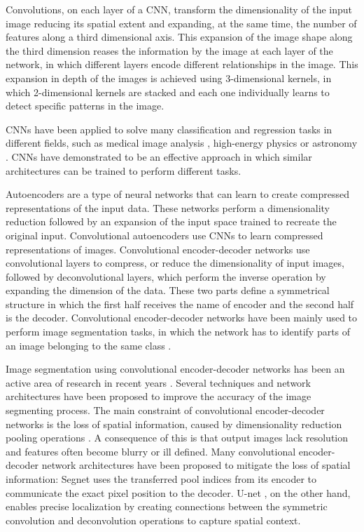 \documentclass[twocol]{ametsoc}
\begin{document}
Convolutions, on each layer of a CNN, transform the dimensionality of the input image reducing its spatial extent and expanding, at the same time, the number of features along a third dimensional axis. This expansion of the image shape along the third dimension reases the information by the image at each layer of the network, in which different layers encode different relationships in the image. This expansion in depth of the images is achieved using 3-dimensional kernels, in which 2-dimensional kernels are stacked and each one individually learns to detect specific patterns in the image.

CNNs have been applied to solve many classification and regression tasks in different fields, such as medical image analysis \citep{litjens2017survey}, high-energy physics \citep{baldi2014searching} or astronomy \citep{dieleman2015rotation}. CNNs have demonstrated to be an effective approach in which similar architectures can be trained to perform different tasks.

Autoencoders \citep{hinton2006reducing} are a type of neural networks that can learn to create compressed representations of the input data. These networks perform a dimensionality reduction followed by an expansion of the input space trained to recreate the original input. Convolutional autoencoders \citep{masci2011stacked} use CNNs to learn compressed representations of images. Convolutional encoder-decoder networks use convolutional layers to compress, or reduce the dimensionality of input images, followed by deconvolutional layers, which perform the inverse operation by expanding the dimension of the data. These two parts define a symmetrical structure in which the first half receives the name of encoder and the second half is the decoder. Convolutional encoder-decoder networks have been mainly used to perform image segmentation tasks, in which the network has to identify parts of an image belonging to the same class \citep{long2015fully}.

Image segmentation using convolutional encoder-decoder networks has been an active area of research in recent years \citep{krizhevsky2012imagenet,chen2018deeplab}. Several techniques and network architectures have been proposed to improve the accuracy of the image segmenting process. The main constraint of convolutional encoder-decoder networks is the loss of spatial information, caused by dimensionality reduction pooling operations \citep{scherer2010evaluation}. A consequence of this is that output images lack resolution and features often become blurry or ill defined. Many convolutional encoder-decoder network architectures have been proposed to mitigate the loss of spatial information: Segnet \citep{badrinarayanan2017segnet} uses the transferred pool indices from its encoder to communicate the exact pixel position to the decoder. U-net \citep{ronneberger2015u}, on the other hand, enables precise localization by creating connections between the symmetric convolution and deconvolution operations to capture spatial context.
\end{document}

